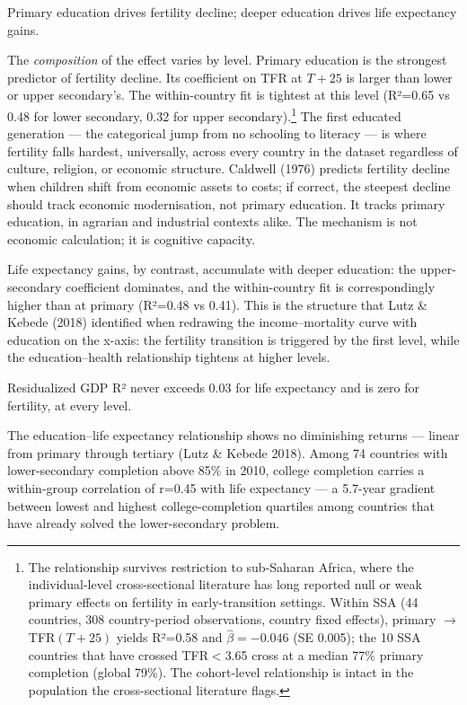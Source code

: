 \documentclass[12pt,letterpaper]{article}
\begin{document}
Primary education drives fertility decline; deeper education drives life expectancy gains.

The \emph{composition} of the
effect varies by level. Primary education is the strongest predictor
of fertility decline. Its coefficient on TFR at $T+25$ is larger than
lower or upper secondary's. The within-country fit is tightest at this
level (R²=0.65 vs 0.48 for lower secondary, 0.32 for upper
secondary).\footnote{The relationship survives restriction to
sub-Saharan Africa, where the individual-level cross-sectional
literature has long reported null or weak primary effects on fertility
in early-transition settings. Within SSA (44 countries, 308
country-period observations, country fixed effects), primary
$\to$ TFR$(T+25)$ yields R²=0.58 and $\hat\beta=-0.046$ (SE 0.005);
the 10 SSA countries that have crossed TFR$<$3.65 cross at a median
77\% primary completion (global 79\%). The cohort-level relationship
is intact in the population the cross-sectional literature flags.} The first educated generation --- the categorical
jump from no schooling to literacy --- is where fertility falls
hardest, universally, across every country in the
dataset regardless of culture, religion, or economic structure.
Caldwell (1976) predicts fertility decline when children shift from economic
assets to costs; if correct, the steepest decline should track economic
modernisation, not primary education. It tracks primary education, in
agrarian and industrial contexts alike. The mechanism is not economic
calculation; it is cognitive capacity.

Life expectancy gains, by contrast, accumulate with deeper education:
the upper-secondary coefficient dominates, and the within-country fit
is correspondingly higher than at primary (R²=0.48 vs 0.41). This
is the structure that Lutz \& Kebede (2018) identified when redrawing
the income--mortality curve with education on the x-axis: the fertility
transition is triggered by the first level, while the education--health
relationship tightens at higher levels.

Residualized GDP R² never exceeds 0.03 for life
expectancy and is zero for fertility, at every level.

The education--life expectancy relationship shows no diminishing returns ---
linear from primary through
tertiary (Lutz \& Kebede 2018). Among 74 countries with lower-secondary
completion above 85\% in 2010, college completion carries a within-group
correlation of r=0.45 with life expectancy --- a 5.7-year gradient
between lowest and highest college-completion quartiles among countries
that have already solved the lower-secondary problem.
\end{document}
